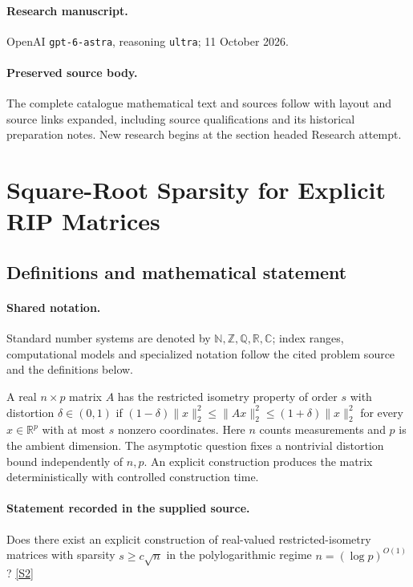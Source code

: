 \documentclass[11pt]{article}
\begin{document}
\paragraph{Research manuscript.} OpenAI \texttt{gpt-6-astra}, reasoning \texttt{ultra}; 11 October 2026.
\paragraph{Preserved source body.} The complete catalogue mathematical text and sources follow with layout and source links expanded, including source qualifications and its historical preparation notes. New research begins at the section headed Research attempt.

\section{Square-Root Sparsity for Explicit RIP Matrices}\label{statement}

\subsection{Definitions and mathematical statement}

\paragraph{Shared notation.}Standard number systems are denoted by $\mathbb N,\mathbb Z,\mathbb Q,\mathbb R,\mathbb C$; index ranges, computational models and specialized notation follow the cited problem source and the definitions below.


A real $n\times p$ matrix $A$ has the restricted isometry property of order $s$ with distortion $\delta\in(0,1)$ if $(1-\delta)\|x\|_2^2\leq\|Ax\|_2^2\leq(1+\delta)\|x\|_2^2$ for every $x\in\mathbb R^p$ with at most $s$ nonzero coordinates. Here $n$ counts measurements and $p$ is the ambient dimension. The asymptotic question fixes a nontrivial distortion bound independently of $n,p$. An explicit construction produces the matrix deterministically with controlled construction time.
\paragraph{Statement recorded in the supplied source.}
Does there exist an explicit construction of real-valued restricted-isometry matrices with sparsity $s\geq c\sqrt n$ in the polylogarithmic regime $n=(\log p)^{O(1)}$? \href{https://doi.org/10.4171/owr/2019/19}{[S2]}
\end{document}
